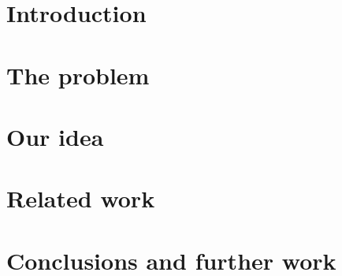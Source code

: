 \section{Introduction}  %

\section{The problem}  %

\section{Our idea}     %

\section{Related work} %

\section{Conclusions and further work}

